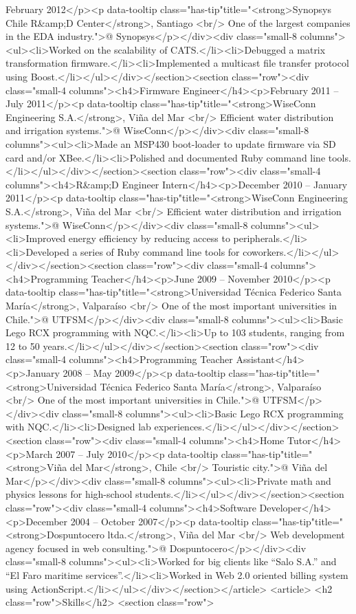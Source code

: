 February 2012</p><p data-tooltip class="has-tip"title="<strong>Synopsys Chile R&amp;D Center</strong>, Santiago <br/> One of the largest companies in the EDA industry.">@ Synopsys</p></div><div class="small-8 columns"><ul><li>Worked on the scalability of CATS.</li><li>Debugged a matrix transformation firmware.</li><li>Implemented a multicast file transfer protocol using Boost.</li></ul></div></section><section class="row"><div class="small-4 columns"><h4>Firmware Engineer</h4><p>February 2011 – July 2011</p><p data-tooltip class="has-tip"title="<strong>WiseConn Engineering S.A.</strong>, Viña del Mar <br/> Efficient water distribution and irrigation systems.">@ WiseConn</p></div><div class="small-8 columns"><ul><li>Made an MSP430 boot-loader to update firmware via SD card and/or XBee.</li><li>Polished and documented Ruby command line tools.</li></ul></div></section><section class="row"><div class="small-4 columns"><h4>R&amp;D Engineer Intern</h4><p>December 2010 – January 2011</p><p data-tooltip class="has-tip"title="<strong>WiseConn Engineering S.A.</strong>, Viña del Mar <br/> Efficient water distribution and irrigation systems.">@ WiseConn</p></div><div class="small-8 columns"><ul><li>Improved energy efficiency by reducing access to peripherals.</li><li>Developed a series of Ruby command line tools for coworkers.</li></ul></div></section><section class="row"><div class="small-4 columns"><h4>Programming Teacher</h4><p>June 2009 – November 2010</p><p data-tooltip class="has-tip"title="<strong>Universidad Técnica Federico Santa María</strong>, Valparaíso <br/> One of the most important universities in Chile.">@ UTFSM</p></div><div class="small-8 columns"><ul><li>Basic Lego RCX programming with NQC.</li><li>Up to 103 students, ranging from 12 to 50 years.</li></ul></div></section><section class="row"><div class="small-4 columns"><h4>Programming Teacher Assistant</h4><p>January 2008 – May 2009</p><p data-tooltip class="has-tip"title="<strong>Universidad Técnica Federico Santa María</strong>, Valparaíso <br/> One of the most important universities in Chile.">@ UTFSM</p></div><div class="small-8 columns"><ul><li>Basic Lego RCX programming with NQC.</li><li>Designed lab experiences.</li></ul></div></section><section class="row"><div class="small-4 columns"><h4>Home Tutor</h4><p>March 2007 – July 2010</p><p data-tooltip class="has-tip"title="<strong>Viña del Mar</strong>, Chile <br/> Touristic city.">@ Viña del Mar</p></div><div class="small-8 columns"><ul><li>Private math and physics lessons for high-school students.</li></ul></div></section><section class="row"><div class="small-4 columns"><h4>Software Developer</h4><p>December 2004 – October 2007</p><p data-tooltip class="has-tip"title="<strong>Dospuntocero ltda.</strong>, Viña del Mar <br/> Web development agency focused in web consulting.">@ Dospuntocero</p></div><div class="small-8 columns"><ul><li>Worked for big clients like “Salo S.A.” and “El Faro maritime services”.</li><li>Worked in Web 2.0 oriented billing system using ActionScript.</li></ul></div></section></article>
    <article>
        <h2 class="row">Skills</h2>
        <section class="row">
        
